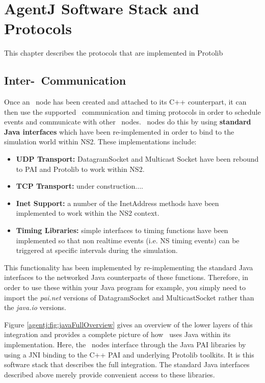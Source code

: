 \chapter{AgentJ Software Stack and Protocols}
\label{protocols}

This chapter describes the protocols that are implemented in Protolib

\section{Inter-\agentj~Communication}

Once an \agentj~node has been created and attached to its C++
counterpart, it can then use the supported \agentj~communication
and timing protocols in order to schedule events and
communicate with other \agentj~nodes. \agentj~nodes do this
by using \textbf{standard Java interfaces} which have been
re-implemented in order to bind to the simulation world within
NS2. These implementations include:

\begin{itemize}
\item \textbf{UDP Transport:} DatagramSocket and Multicast Socket have been
rebound to PAI and Protolib to work within NS2.
\item \textbf{TCP Transport:} under construction....
\item \textbf{Inet Support:} a number of the InetAddress methods have been
implemented to work within the NS2 context.
\item \textbf{Timing Libraries:} simple interfaces to timing functions have been
implemented so that non realtime events (i.e. NS timing events) can be triggered
at specific intervals during the simulation.
\end{itemize}

This functionality has been implemented by re-implementing the standard Java
interfaces to the networked Java counterparts of these functions. Therefore, in
order to use these within your Java program for example, you simply need to
import the \emph{pai.net} versions of DatagramSocket and MulticastSocket
rather than the \emph{java.io} versions.


Figure \ref{agentj:fig:javaFullOverview} gives an overview of the lower layers
of this integration and provides a complete picture of how \agentj~uses Java
within its implementation.  Here, the \agentj~nodes interface through the
Java PAI libraries by using a JNI binding to the C++ PAI and underlying
Protolib toolkits. It is this software stack that describes the full integration.
The standard Java interfaces described above merely provide convenient
access to these libraries.


